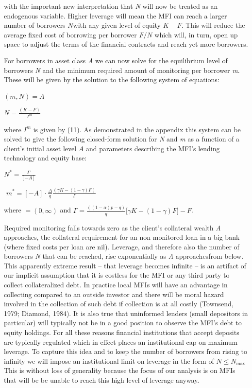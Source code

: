 \documentclass[
]{article}
\begin{document}
with the important new interpretation that \emph{N} will now be treated
as an endogenous variable. Higher leverage will mean the MFI can reach a
larger number of borrowers \(N\)with any given level of equity
\(K - F\). This will reduce the average fixed cost of borrowing per
borrower \(F/N\) which will, in turn, open up space to adjust the terms
of the financial contracts and reach yet more borrowers.

For borrowers in asset class \emph{A} we can now solve for the
equilibrium level of borrowers \emph{N} and the minimum required amount
of monitoring per borrower \emph{m}. These will be given by the solution
to the following system of equations:

\((m,N) = A\)

\(N = \frac{(K - F)}{I^{m}}\)

where \(I^{m}\) is given by (11). As demonstrated in the appendix this
system can be solved to give the following closed-form solution for
\emph{N} and \emph{m} as a function of a client's initial asset level
\(A\) and parameters describing the MFI's lending technology and equity
base:

\(N^{*} = \frac{\Gamma}{\left\lbrack - A \right\rbrack}\mspace{6mu}\)

\(\mspace{6mu} m^{*} = \left\lbrack - A \right\rbrack \cdot \frac{\Delta}{q}\frac{(\gamma K - (1 - \gamma)F)}{\Gamma}\)

where \(= (0,\infty)\) and
\(\Gamma = \frac{((1 - \alpha)p - q)}{q}\lbrack\gamma K - (1 - \gamma)F\rbrack - F\).

Required monitoring falls towards zero as the client's collateral wealth
\emph{A} approaches\(\), the collateral requirement for an non-monitored
loan in a big bank (where fixed costs per loan are nil). Leverage, and
therefore also the number of borrowers \emph{N} that can be reached,
rise exponentially as \emph{A} approaches\(\)from below. This apparently
extreme result -- that leverage becomes infinite -- is an artifact of
our implicit assumption that it is costless for the MFI or any third
party to collect collateralized debt. In practice local MFIs will have
an advantage in collecting compared to an outside investor and there
will be moral hazard involved in the collection of such debt if
collection is at all costly (Townsend, 1979; Diamond, 1984). It is also
true that uninformed lenders (small depositors in particular) will
typically not be in a good position to observe the MFI's debt to equity
holdings. For all these reasons financial institutions that accept
deposits are typically regulated which in effect places an institutional
cap on maximum leverage. To capture this idea and to keep the number of
borrowers from rising to infinity we will impose an institutional limit
on leverage in the form of \(N \leq N_{\max}\) This is without loss of
generality because the focus of our analysis is on MFIs that will be be
unable to reach this high level of leverage anyway.
\end{document}
